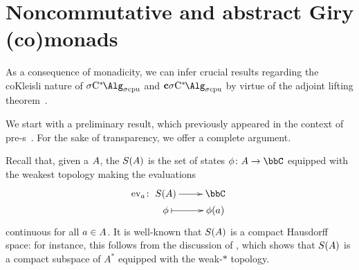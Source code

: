 \section{Noncommutative and abstract Giry (co)monads}\label{sec:giry}
As a consequence of monadicity, we can infer crucial results regarding the coKleisli nature of $\SigmaCcpu$ and $\cSigmaCcpu$ by virtue of the adjoint lifting theorem~\cite[Theorem 4.5.6]{borceux94handbook2}.

We start with a preliminary result, which previously appeared in the context of pre-\cstar{}s~\cite[Proposition 4.18]{fritz2023involutive}.
For the sake of transparency, we offer a complete argument.

Recall that, given a \cstar{} ${A}$, the  $S({A})$ is the set of states $\phi\colon \A \to \bbC$ equipped with the weakest topology making the evaluations
\[
	\ev_a \colon \xymatrix@R=0.1em{
	S(\A) \ar[r]
	& \bbC \\
	\phi  \ar@{|->}[r]
	& \phi(a)
	}
\]
continuous for all $a\in {A}$.
It is well-known that $S({A})$ is a compact Hausdorff space: for instance, this follows from the discussion of \cite[3.2.1]{pedersen2018automgroups}, which shows that $S({A})$ is a compact subspace of $A^*$ equipped with the weak-$*$ topology.

